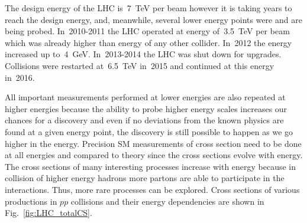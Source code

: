 

The design energy of the LHC is~7~TeV per beam however it is taking years to reach the design energy, and, meanwhile, several lower energy points were and are being probed. In~2010-2011 the LHC operated at energy of~3.5~TeV per beam which was already higher than energy of any other collider. In~2012 the energy increased up to~4~GeV. In~2013-2014 the LHC was shut down for upgrades. Collisions were restarted at~6.5~TeV in~2015 and continued at this energy in~2016. 

All important measurements performed at lower energies are also repeated at higher energies because the ability to probe higher energy scales increases our chances for a discovery and even if no deviations from the known physics are found at a given energy point, the discovery is still possible to happen as we go higher in the energy. Precision SM measurements of cross section need to be done at all energies and compared to theory since the cross sections evolve with energy. The cross sections of many interesting processes increase with energy because in collision of higher energy hadrons more partons are able to participate in the interactions. Thus, more rare processes can be explored. Cross sections of various productions in $pp$ collisions and their energy dependencies are shown in Fig.~\ref{fig:LHC_totalCS}.

